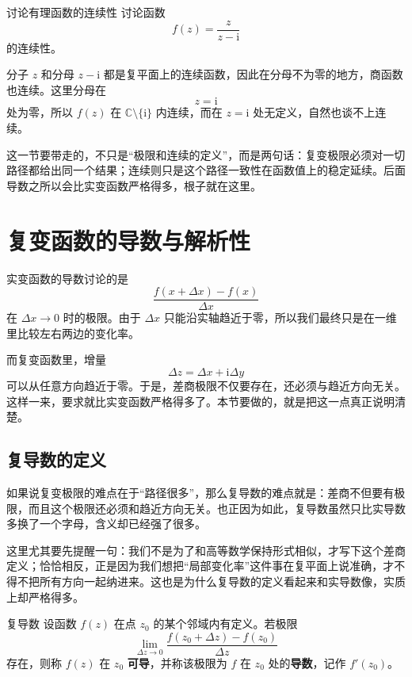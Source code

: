 \begin{lizi}{讨论有理函数的连续性}{}
讨论函数
\[
    f(z)=\frac{z}{z-\mathrm{i}}
\]
的连续性。

\begin{jie}
分子 $z$ 和分母 $z-\mathrm{i}$ 都是复平面上的连续函数，因此在分母不为零的地方，商函数也连续。这里分母在
\[
    z=\mathrm{i}
\]
处为零，所以 $f(z)$ 在 $\mathbb{C}\setminus\{\mathrm{i}\}$ 内连续，而在 $z=\mathrm{i}$ 处无定义，自然也谈不上连续。
\end{jie}
\end{lizi}

\begin{tishi}[本节小结]
这一节要带走的，不只是``极限和连续的定义''，而是两句话：复变极限必须对一切路径都给出同一个结果；连续则只是这个路径一致性在函数值上的稳定延续。后面导数之所以会比实变函数严格得多，根子就在这里。
\end{tishi}

\section{复变函数的导数与解析性}

\begin{wulibj}[为什么复导数会比实导数苛刻得多]
实变函数的导数讨论的是
\[
    \frac{f(x+\Delta x)-f(x)}{\Delta x}
\]
在 $\Delta x\to 0$ 时的极限。由于 $\Delta x$ 只能沿实轴趋近于零，所以我们最终只是在一维里比较左右两边的变化率。

而复变函数里，增量
\[
    \Delta z=\Delta x+\mathrm{i}\Delta y
\]
可以从任意方向趋近于零。于是，差商极限不仅要存在，还必须与趋近方向无关。这样一来，要求就比实变函数严格得多了。本节要做的，就是把这一点真正说明清楚。
\end{wulibj}

\subsection{复导数的定义}

如果说复变极限的难点在于``路径很多''，那么复导数的难点就是：差商不但要有极限，而且这个极限还必须和趋近方向无关。也正因为如此，复导数虽然只比实导数多换了一个字母，含义却已经强了很多。

这里尤其要先提醒一句：我们不是为了和高等数学保持形式相似，才写下这个差商定义；恰恰相反，正是因为我们想把``局部变化率''这件事在复平面上说准确，才不得不把所有方向一起纳进来。这也是为什么复导数的定义看起来和实导数像，实质上却严格得多。

\begin{dingliyi}{复导数}{}
设函数 $f(z)$ 在点 $z_0$ 的某个邻域内有定义。若极限
\begin{equation}
    \lim_{\Delta z\to 0}\frac{f(z_0+\Delta z)-f(z_0)}{\Delta z}
\end{equation}
存在，则称 $f(z)$ 在 $z_0$ \textbf{可导}，并称该极限为 $f$ 在 $z_0$ 处的\textbf{导数}，记作 $f'(z_0)$。
\end{dingliyi}

